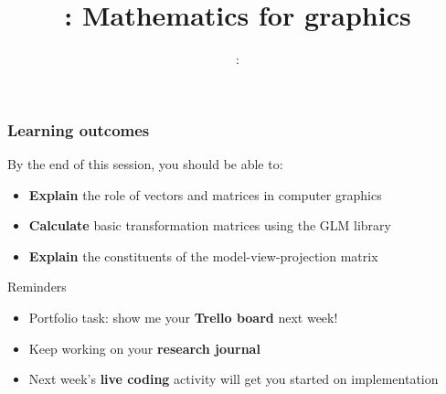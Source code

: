 \usepackage{../../beamerthemeFalmouthGamesAcademy}
\usepackage{multimedia}
\graphicspath{ {../../} }




\usepackage[normalem]{ulem}
\usepackage{wasysym}

\usepackage{pdfpages}

\usetikzlibrary{arrows,automata}




\title{\sessionnumber: Mathematics for graphics}
\subtitle{\modulecode: \moduletitle}

\frame{\titlepage} 

\begin{frame}
	\frametitle{Learning outcomes}
	By the end of this session, you should be able to:
	\begin{itemize}
		\item \textbf{Explain} the role of vectors and matrices in computer graphics
		\item \textbf{Calculate} basic transformation matrices using the GLM library
		\item \textbf{Explain} the constituents of the model-view-projection matrix
	\end{itemize}
\end{frame}

\begin{frame}{Reminders}
	\begin{itemize}
		\pause\item Portfolio task: show me your \textbf{Trello board} next week!
		\pause\item Keep working on your \textbf{research journal}
		\pause\item Next week's \textbf{live coding} activity will get you started on implementation
	\end{itemize}
\end{frame}







